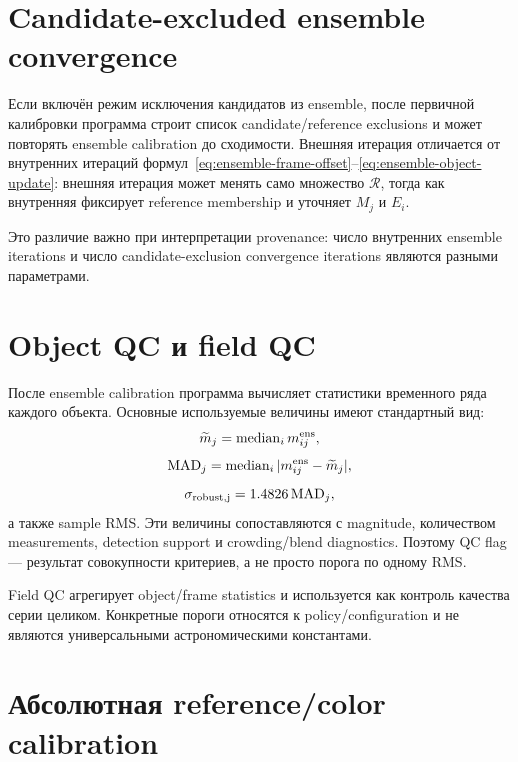 \section{Candidate-excluded ensemble convergence}

Если включён режим исключения кандидатов из ensemble, после первичной калибровки программа строит список candidate/reference exclusions и может повторять ensemble calibration до сходимости. Внешняя итерация отличается от внутренних итераций формул~\eqref{eq:ensemble-frame-offset}--\eqref{eq:ensemble-object-update}: внешняя итерация может менять само множество $\mathcal R$, тогда как внутренняя фиксирует reference membership и уточняет $M_j$ и $E_i$.

Это различие важно при интерпретации provenance: число внутренних ensemble iterations и число candidate-exclusion convergence iterations являются разными параметрами.

\section{Object QC и field QC}

После ensemble calibration программа вычисляет статистики временного ряда каждого объекта. Основные используемые величины имеют стандартный вид:
\begin{equation}
  \widetilde m_j=\operatorname{median}_i m^{\rm ens}_{ij},
\end{equation}
\begin{equation}
  \mathrm{MAD}_j=\operatorname{median}_i
  |m^{\rm ens}_{ij}-\widetilde m_j|,
\end{equation}
\begin{equation}
  \sigma_{\rm robust,j}=1.4826\,\mathrm{MAD}_j,
\end{equation}
а также sample RMS. Эти величины сопоставляются с magnitude, количеством measurements, detection support и crowding/blend diagnostics. Поэтому QC flag --- результат совокупности критериев, а не просто порога по одному RMS.

Field QC агрегирует object/frame statistics и используется как контроль качества серии целиком. Конкретные пороги относятся к policy/configuration и не являются универсальными астрономическими константами.

\section{Абсолютная reference/color calibration}
\label{sec:color-calibration-math}

